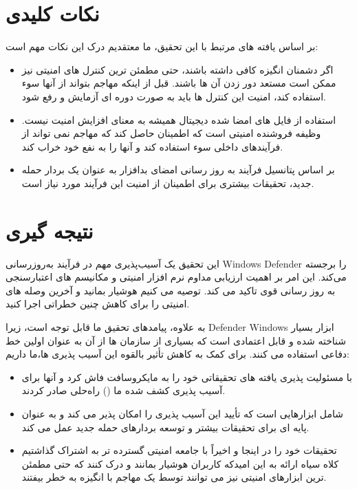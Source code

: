 \documentclass{ISCISC2020}
\begin{document}
\section{نکات کلیدی}
بر اساس یافته های مرتبط با این تحقیق، ما معتقدیم درک این نکات مهم است:
\begin{itemize}
\item
اگر دشمنان انگیزه کافی داشته باشند، حتی مطمئن ترین کنترل های امنیتی نیز ممکن است مستعد دور زدن آن ها باشند. قبل از اینکه مهاجم بتواند از آنها سوء استفاده کند، امنیت این کنترل ها باید به صورت دوره ای آزمایش و رفع شود.
\item
استفاده از فایل های امضا شده دیجیتال همیشه به معنای افزایش امنیت نیست. وظیفه فروشنده امنیتی است که اطمینان حاصل کند که مهاجم نمی تواند از فرآیندهای داخلی سوء استفاده کند و آنها را به نفع خود خراب کند.
\item
بر اساس پتانسیل فرآیند به روز رسانی امضای بدافزار به عنوان یک بردار حمله جدید، تحقیقات بیشتری برای اطمینان از امنیت این فرآیند مورد نیاز است.
\end{itemize}

\section{نتیجه گیری‌}
این تحقیق یک آسیب‌پذیری مهم در فرآیند به‌روزرسانی Windows Defender را برجسته می‌کند. این امر بر اهمیت ارزیابی مداوم نرم افزار امنیتی و مکانیسم های اعتبارسنجی به روز رسانی قوی تاکید می کند. توصیه می کنیم هوشیار بمانید و آخرین وصله های امنیتی را برای کاهش چنین خطراتی اجرا کنید.


به علاوه، پیامدهای تحقیق ما قابل توجه است، زیرا Defender Windows ابزار بسیار شناخته شده و قابل اعتمادی است که 
بسیاری از سازمان ها از آن به عنوان اولین خط دفاعی استفاده می کنند. برای کمک به کاهش تأثیر بالقوه این 
آسیب پذیری ها،ما داریم:
\begin{itemize}
\item
با مسئولیت پذیری یافته های تحقیقاتی خود را به مایکروسافت فاش کرد و آنها برای آسیب پذیری کشف 
شده ما ()\lr{[3]} راه‌حلی صادر کردند.
\item
شامل ابزارهایی است که تأیید این آسیب پذیری را امکان پذیر می کند و به عنوان پایه ای برای 
تحقیقات بیشتر و توسعه بردارهای حمله جدید عمل می کند.
\item
تحقیقات خود را در اینجا و اخیراً با جامعه امنیتی گسترده تر به اشتراک گذاشتیم کلاه سیاه\lr{[4]} ارائه به این 
امیدکه کاربران هوشیار بمانند و درک کنند که حتی مطمئن ترین ابزارهای امنیتی نیز می توانند توسط 
یک مهاجم با انگیزه به خطر بیفتند.
\end{itemize}
\end{document}

